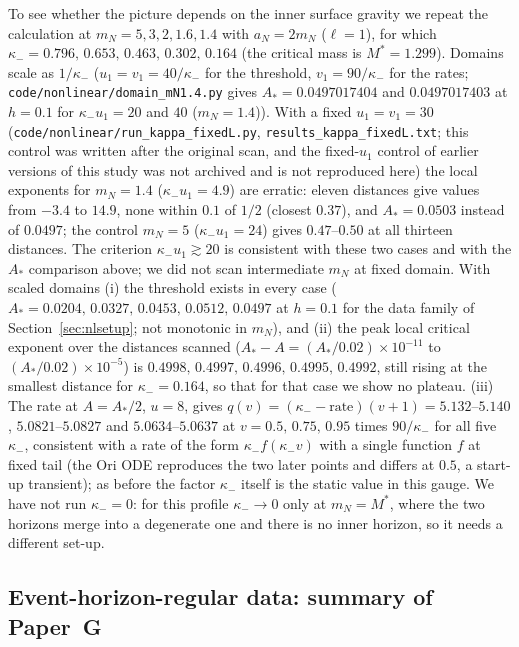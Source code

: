 \documentclass[11pt]{article}
\begin{document}
To see whether the picture depends on the inner surface gravity we repeat the calculation at $m_N=5,3,2,1.6,1.4$ with $a_N=2m_N$ ($\ell=1$), for which $\kappa_-=0.796,\,0.653,\,0.463,\,0.302,\,0.164$ (the critical mass is $M^*=1.299$). Domains scale as $1/\kappa_-$ ($u_1=v_1=40/\kappa_-$ for the threshold, $v_1=90/\kappa_-$ for the rates; \texttt{code/nonlinear/domain\_mN1.4.py} gives $A_*=0.0497017404$ and $0.0497017403$ at $h=0.1$ for $\kappa_-u_1=20$ and $40$ ($m_N=1.4$)). With a fixed $u_1=v_1=30$ (\texttt{code/nonlinear/run\_kappa\_fixedL.py}, \texttt{results\_kappa\_fixedL.txt}; this control was written after the original scan, and the fixed-$u_1$ control of earlier versions of this study was not archived and is not reproduced here) the local exponents for $m_N=1.4$ ($\kappa_-u_1=4.9$) are erratic: eleven distances give values from $-3.4$ to $14.9$, none within $0.1$ of $1/2$ (closest $0.37$), and $A_*=0.0503$ instead of $0.0497$; the control $m_N=5$ ($\kappa_-u_1=24$) gives $0.47$--$0.50$ at all thirteen distances. The criterion $\kappa_-u_1\gtrsim20$ is consistent with these two cases and with the $A_*$ comparison above; we did not scan intermediate $m_N$ at fixed domain. With scaled domains (i) the threshold exists in every case ($A_*=0.0204,\,0.0327,\,0.0453,\,0.0512,\,0.0497$ at $h=0.1$ for the data family of Section~\ref{sec:nlsetup}; not monotonic in $m_N$), and (ii) the peak local critical exponent over the distances scanned ($A_*-A=(A_*/0.02)\times10^{-11}$ to $(A_*/0.02)\times10^{-5}$) is $0.4998,\,0.4997,\,0.4996,\,0.4995,\,0.4992$, still rising at the smallest distance for $\kappa_-=0.164$, so that for that case we show no plateau. (iii) The rate at $A=A_*/2$, $u=8$, gives $q(v)=(\kappa_--\text{rate})(v+1)=5.132$--$5.140$, $5.0821$--$5.0827$ and $5.0634$--$5.0637$ at $v=0.5,\,0.75,\,0.95$ times $90/\kappa_-$ for all five $\kappa_-$, consistent with a rate of the form $\kappa_-f(\kappa_-v)$ with a single function $f$ at fixed tail (the Ori ODE reproduces the two later points and differs at $0.5$, a start-up transient); as before the factor $\kappa_-$ itself is the static value in this gauge. We have not run $\kappa_-=0$: for this profile $\kappa_-\to0$ only at $m_N=M^*$, where the two horizons merge into a degenerate one and there is no inner horizon, so it needs a different set-up.

\subsection{Event-horizon-regular data: summary of Paper~G}
\label{sec:ehsummary}
\end{document}
